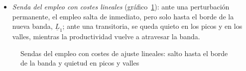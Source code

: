 \documentclass[11pt]{article}
\begin{document}
\begin{itemize}
\item \emph{Senda del empleo con costes lineales} (gráfico~\ref{fig:sendas-lineales}): ante una perturbación permanente, el empleo salta de inmediato, pero solo hasta el borde de la nueva banda, $\underline{L}_1$; ante una transitoria, se queda quieto en los picos y en los valles, mientras la productividad vuelve a atravesar la banda.
\end{itemize}

\begin{figure}[H]
\centering
\caption{Sendas del empleo con costes de ajuste lineales: salto hasta el borde de la banda y quietud en picos y valles}\label{fig:sendas-lineales}
\end{figure}
\end{document}
